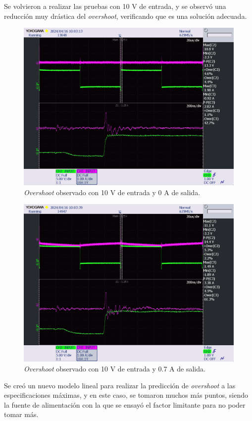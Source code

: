 Se volvieron a realizar las pruebas con 10 V de entrada, y se observó una reducción muy drástica del \textit{overshoot}, verificando que es una solución adecuada.

\begin{figure}[H]
	\centering
	\includegraphics[width=0.7\linewidth]{fig/overshootFinal1}
	\caption{\textit{Overshoot} observado con 10 V de entrada y 0 A de salida.}
\end{figure}

\begin{figure}[H]
	\centering
	\includegraphics[width=0.7\linewidth]{fig/overshootFinal2}
	\caption{\textit{Overshoot} observado con 10 V de entrada y 0.7 A de salida.}
\end{figure}

Se creó un nuevo modelo lineal para realizar la predicción de \textit{overshoot} a las especificaciones máximas, y en este caso, se tomaron muchos más puntos, siendo la fuente de alimentación con la que se ensayó el factor limitante para no poder tomar más.

